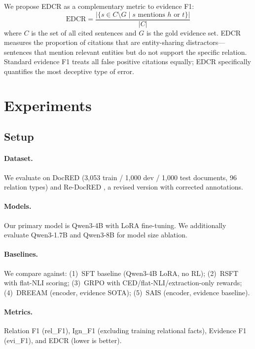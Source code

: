 \documentclass[11pt,a4paper]{article}
\begin{document}
We propose EDCR as a complementary metric to evidence F1:
\begin{equation}
    \text{EDCR} = \frac{|\{s \in C \setminus G \mid s \text{ mentions } h \text{ or } t\}|}{|C|}
\end{equation}
where $C$ is the set of all cited sentences and $G$ is the gold evidence set. EDCR measures the proportion of citations that are entity-sharing distractors---sentences that mention relevant entities but do not support the specific relation. Standard evidence F1 treats all false positive citations equally; EDCR specifically quantifies the most deceptive type of error.

\section{Experiments}

\subsection{Setup}

\paragraph{Dataset.} We evaluate on DocRED \cite{yao2019docred} (3,053 train / 1,000 dev / 1,000 test documents, 96 relation types) and Re-DocRED \cite{tan2022redocred}, a revised version with corrected annotations.

\paragraph{Models.} Our primary model is Qwen3-4B with LoRA fine-tuning. We additionally evaluate Qwen3-1.7B and Qwen3-8B for model size ablation.

\paragraph{Baselines.} We compare against: (1)~SFT baseline (Qwen3-4B LoRA, no RL); (2)~RSFT with flat-NLI scoring; (3)~GRPO with CED/flat-NLI/extraction-only rewards; (4)~DREEAM \cite{tan2022dreeam} (encoder, evidence SOTA); (5)~SAIS \cite{xiao2022sais} (encoder, evidence baseline).

\paragraph{Metrics.} Relation F1 (rel\_F1), Ign\_F1 (excluding training relational facts), Evidence F1 (evi\_F1), and EDCR (lower is better).
\end{document}
